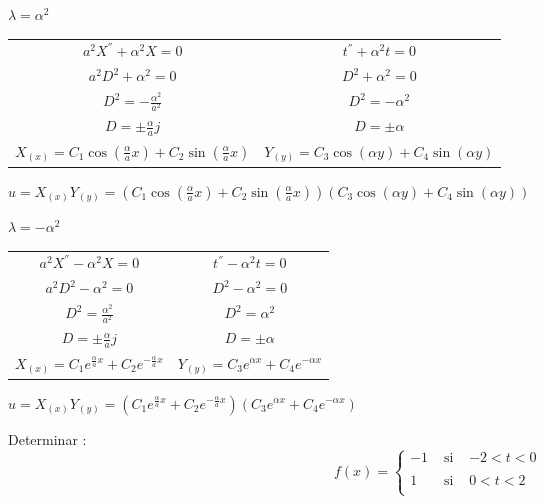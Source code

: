 \documentclass[10pt,a4paper]{article}
\begin{document}
\begin{enumerate}
\begin{center}
$\lambda=\alpha^2$
\end{center}

\begin{center}
\begin{tabular}{c c} 
 
$a^2{ X }^{ '' }+{\alpha}^2X=0$ & ${ t }^{ '' }+{\alpha}^2t=0$   \\ 
$a^2D^2+{\alpha}^2=0$                      & $D^2+{\alpha}^2=0$  \\ 
$D^2=-\frac{{\alpha}^{ 2 }}{a^2}$ & $D^2=-{\alpha}^2$  \\ 
$D= \pm \frac{\alpha}{a}j$ & $D=\pm \alpha$  \\ 
$X_{(x)}=C_1\cos(\frac{\alpha}{a} x)+C_2 \sin(\frac{\alpha}{a} x)$ & $Y_{(y)}=C_3\cos(\alpha y)+C_4\sin(\alpha y)$  \\
\end{tabular}
\end{center}
$u=X_{(x)} Y_{(y)}=(C_1\cos(\frac{\alpha}{a} x)+C_2 \sin(\frac{\alpha}{a} x))(C_3\cos(\alpha y)+C_4\sin(\alpha y))$


\begin{center}
$\lambda=-\alpha^2$
\end{center}

\begin{center}
\begin{tabular}{c c} 
 
$a^2{ X }^{ '' }-{\alpha}^2X=0$ & ${ t }^{ '' }-{\alpha}^2t=0$   \\ 
$a^2D^2-{\alpha}^2=0$                      & $D^2-{\alpha}^2=0$  \\ 
$D^2=\frac{{\alpha}^{ 2 }}{a^2}$ & $D^2={\alpha}^2$  \\ 
$D=\pm \frac{\alpha}{a}j$ & $D=\pm \alpha$  \\ 
$X_{(x)}=C_1 e^{\frac{\alpha}{a} x} +C_2 e^{-\frac{\alpha}{a} x}$ & $Y_{(y)}=C_3e^{\alpha x}+C_4e^{-\alpha x}$  \\

\end{tabular}
\end{center}
$u=X_{(x)} Y_{(y)}=(C_1 e^{\frac{\alpha}{a} x} +C_2 e^{-\frac{\alpha}{a} x})(C_3e^{\alpha x}+C_4e^{-\alpha x})$

\end{enumerate}
Determinar :
\[
f(x)= \left\{ \begin{array}{lcl}
-1 & \mbox{ si } & -2 < t < 0 \\
& & \\
1 & \mbox{ si } & 0 < t < 2\\

\end{array}
\right.
\]
\end{document}
